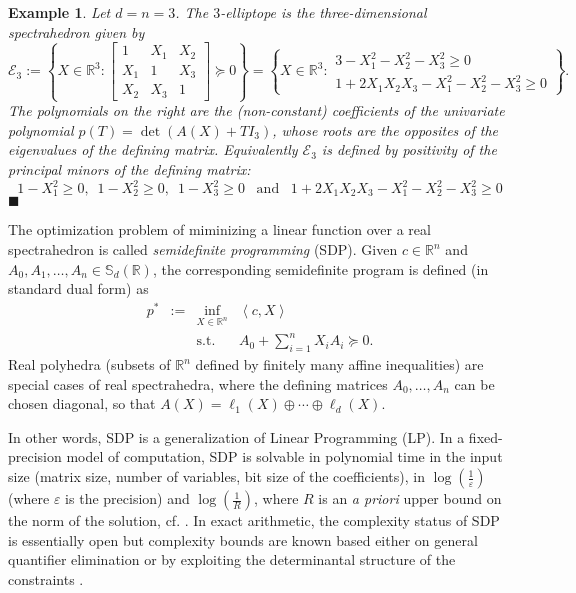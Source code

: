 \documentclass[a4paper,12pt]{article}
\newtheorem{example}{Example}
\newcommand{\R}{\mathbb{R}} %
\newcommand{\sym}{\mathbb{S}} %
\newcommand{\exend}{\hfill $\blacksquare$}
\begin{document}
\begin{example}\label{ell3}
  Let $d=n=3$. The $3$-elliptope is the three-dimensional spectrahedron given by
  $$
  \mathcal{E}_3 :=
  \left\{
  X
  \in \R^3 :
  \begin{bmatrix}
    1 & X_1 & X_2 \\
    X_1 & 1 & X_3 \\
    X_2 & X_3 & 1
  \end{bmatrix}
  \succeq 0
  \right\}
  =
  \left\{
  X
  \in \R^3 :
  \begin{array}{r}
    3-X_1^2-X_2^2-X_3^2 \geq 0 \\
    1+2X_1X_2X_3-X_1^2-X_2^2-X_3^2 \geq 0
  \end{array}
  \right\}.
  $$
  The polynomials on the right are the (non-constant) coefficients of the univariate polynomial
  $p(T) = \det(A(X)+T I_3)$,
  whose roots are the opposites of the eigenvalues of the defining matrix. Equivalently $\mathcal{E}_3$
  is defined by positivity of the principal minors of the defining matrix:
  $$
  1-X_1^2 \geq 0, \,\,\, 1-X_2^2 \geq 0, \,\,\, 1-X_3^2 \geq 0 \,\,\, \text{ and } \,\,\, 1+2X_1X_2X_3-X_1^2-X_2^2-X_3^2 \geq 0
  $$
  \exend
\end{example}

The optimization problem of miminizing a linear function over a real spectrahedron is called {\it semidefinite programming} (SDP). Given $c \in \R^n$ and $A_0,A_1,\ldots,A_n \in \sym_d(\R)$, the corresponding semidefinite program is defined (in standard dual form) as
\begin{equation}
  \label{SDP}
\begin{array}{rcll}
  p^* & := & \inf_{X \in \R^n} & \left\langle c, X \right\rangle \\
  &    & \text{s.t.}         & A_0+\sum_{i=1}^n X_i A_i \succeq 0.
\end{array}
\end{equation}
Real polyhedra (subsets of $\R^n$ defined by finitely many affine inequalities) are special cases of real
spectrahedra, where the defining matrices $A_0, \ldots, A_n$ can be chosen diagonal, so that $A(X) =
\ell_1(X) \oplus \cdots \oplus \ell_d(X)$.

In other words, SDP is a generalization
of Linear Programming (LP). In a fixed-precision model of computation, SDP is solvable in polynomial time in the
input size (matrix size,
number of variables, bit size of the coefficients), in $\log(\frac{1}{\varepsilon})$ (where $\varepsilon$ is the
precision) and $\log(\frac{1}{R})$, where $R$ is an {\it a priori} upper bound on the norm of the solution,
cf. \cite[Sec.1.9]{deKlerk}. In exact arithmetic, the complexity status of SDP is essentially open but complexity
bounds are known based either on general quantifier elimination \cite{ramana1997exact,porkolab1997complexity}
or by exploiting the determinantal structure of the constraints \cite{henrion2016exact}.
\end{document}
